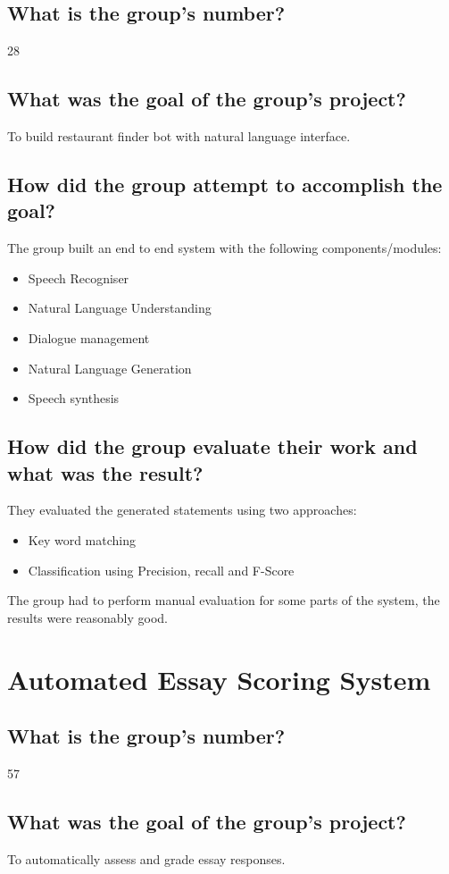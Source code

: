 \documentclass[letterpaper]{article}
\begin{document}
\subsection{What is the group's number?}
28
\subsection{What was the goal of the group's project?}
To build restaurant finder bot with natural language interface.
\subsection{How did the group attempt to accomplish the goal?}
The group built an end to end system with the following components/modules:
\begin{itemize}
	\item Speech Recogniser
	\item Natural Language Understanding
	\item Dialogue management
	\item Natural Language Generation
	\item Speech synthesis
\end{itemize}

\subsection{How did the group evaluate their work and what was the result?}
They evaluated the generated statements using two approaches:
\begin{itemize}
	\item Key word matching
	\item Classification using Precision, recall and F-Score
\end{itemize}
The group had to perform manual evaluation for some parts of the system, the results were reasonably good.


\section{Automated Essay Scoring System}
\subsection{What is the group's number?}
57
\subsection{What was the goal of the group's project?}
To automatically assess and grade essay responses.
\end{document}
